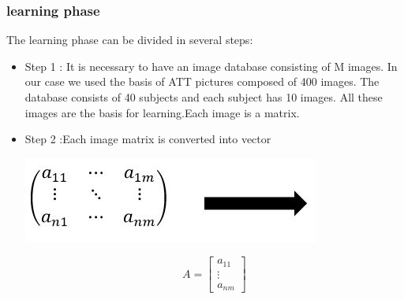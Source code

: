 \subsubsection{learning phase}
 The learning phase can be divided in several steps:
 \begin{itemize}
 \item Step 1 : It is necessary to have an image database consisting of M images. In our case we used the basis of ATT pictures composed of 400 images. The database consists of 40 subjects and each subject has 10 images. All these images are the basis for learning.Each image is a matrix.
 \item Step 2 :Each image matrix is converted into vector










\parbox{0.60\linewidth}{\includegraphics[scale=0.75]{matrice2vector}%
}
\parbox{0.15\linewidth}{


\begin{displaymath} A=\left[\begin{array}{ccc}
a_{11} \\
\vdots \\
a_{nm} 
\end{array}\right] \end{displaymath}
}




\end{itemize}
